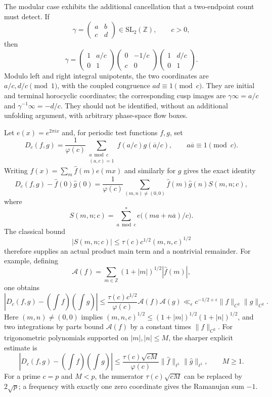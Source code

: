 \documentclass[11pt,a4paper]{article}
\numberwithin{equation}{section}
\theoremstyle{definition}
\theoremstyle{remark}
\begin{document}
The modular case exhibits the additional cancellation that a two-endpoint
count must detect.  If
\[
 \gamma=\begin{pmatrix}a&b\\c&d\end{pmatrix}\in\mathrm{SL}_2(\mathbb Z),
 \qquad c>0,
\]
then
\begin{equation}\label{eq:pairbruhat}
 \gamma=
 \begin{pmatrix}1&a/c\\0&1\end{pmatrix}
 \begin{pmatrix}0&-1/c\\c&0\end{pmatrix}
 \begin{pmatrix}1&d/c\\0&1\end{pmatrix}.
\end{equation}
Modulo left and right integral unipotents, the two coordinates are
$a/c,d/c\pmod1$, with the coupled congruence $ad\equiv1\pmod c$.
They are initial and terminal horocyclic coordinates; the corresponding
cusp images are $\gamma\infty=a/c$ and
$\gamma^{-1}\infty=-d/c$.  They should not be identified, without an
additional unfolding argument, with arbitrary phase-space flow boxes.

Let $e(x)=e^{2\pi ix}$ and, for periodic test functions $f,g$, set
\[
 D_c(f,g)=\frac1{\varphi(c)}
       \sum_{\substack{a\bmod c\\(a,c)=1}}
           f(a/c)g(\overline a/c),\qquad
 a\overline a\equiv1\pmod c.
\]
Writing $f(x)=\sum_m\widehat f(m)e(mx)$ and similarly for $g$ gives the exact
identity
\begin{equation}\label{eq:pairkloosterman}
 D_c(f,g)-\widehat f(0)\widehat g(0)
 =\frac1{\varphi(c)}
   \sum_{(m,n)\ne(0,0)}\widehat f(m)\widehat g(n)S(m,n;c),
\end{equation}
where
\[
 S(m,n;c)=\sum_{a\bmod c}^{*}e\bigl((ma+n\overline a)/c\bigr).
\]
The classical bound \cite[Section~1.1 and equation~(3.2)]{HumphriesModular}
\[
 |S(m,n;c)|\leq\tau(c)c^{1/2}(m,n,c)^{1/2}
\]
therefore supplies an actual product main term and a nontrivial remainder.
For example, defining
\[
 \mathcal A(f)=\sum_{m\in\mathbb Z}(1+|m|)^{1/2}|\widehat f(m)|,
\]
one obtains
\begin{equation}\label{eq:pairkloostermansmooth}
 |D_c(f,g)-(\int f)(\int g)|
 \leq\frac{\tau(c)c^{1/2}}{\varphi(c)}\mathcal A(f)\mathcal A(g)
 \ll_\epsilon c^{-1/2+\epsilon}\|f\|_{C^2}\|g\|_{C^2}.
\end{equation}
Here $(m,n)\ne(0,0)$ implies
$(m,n,c)^{1/2}\leq(1+|m|)^{1/2}(1+|n|)^{1/2}$, and two integrations by
parts bound $\mathcal A(f)$ by a constant times $\|f\|_{C^2}$.
For trigonometric polynomials supported on $|m|,|n|\leq M$, the sharper
explicit estimate is
\[
 |D_c(f,g)-(\int f)(\int g)|
 \leq\frac{\tau(c)\sqrt{cM}}{\varphi(c)}
             \|\widehat f\|_{\ell^1}\|\widehat g\|_{\ell^1},
 \qquad M\geq1.
\]
For a prime $c=p$ and $M<p$, the numerator $\tau(c)\sqrt{cM}$ can be
replaced by $2\sqrt p$; a frequency with exactly one zero coordinate gives
the Ramanujan sum $-1$.
\end{document}
